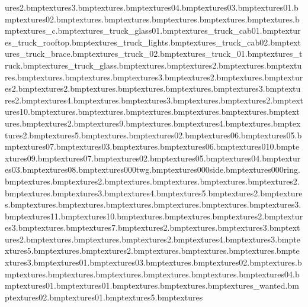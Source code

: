 ures\tazfacecoin2.bmp textures\tazfacecoin3.bmp textures\tazfacecoin.bmp textures\crucher04.bmp textures\crucher03.bmp textures\crucher01.bmp textures\crucher02.bmp textures\post.bmp textures\tazwantedposback.bmp textures\vase.bmp textures\paintgoswarp.bmp textures\paintdafwarp.bmp textures\wheel_c.bmp textures\removal_truck_glass01.bmp textures\removal_truck_cab01.bmp textures\removal_truck_rooftop.bmp textures\removal_truck_lights.bmp textures\removal_truck_cab02.bmp textures\removal_truck_brace.bmp textures\removal_truck_02.bmp textures\removal_truck_01.bmp textures\removal_truck.bmp textures\removal_truck_glass.bmp textures\nut.bmp textures\nut2.bmp textures\bucketmop.bmp textures\bucket.bmp textures\warnsign.bmp textures\cardbox.bmp textures\cardbox3.bmp textures\cardbox2.bmp textures\leatherseatgreen.bmp textures\leatherseatgreen2.bmp textures\leatherseat2.bmp textures\glasscabinet.bmp textures\poolside.bmp textures\tabletop.bmp textures\plasticbox3.bmp textures\plasticbox2.bmp textures\plasticbox4.bmp textures\vertdoor.bmp textures\warningsign3.bmp textures\warningsign.bmp textures\warningsign2.bmp textures\painting10.bmp textures\sdoorglass.bmp textures\sdoor.bmp textures\barrol.bmp textures\lorrymixer.bmp textures\torch.bmp textures\cloud.bmp textures\signdirection2.bmp textures\signdirection9.bmp textures\doorbig.bmp textures\compmont4.bmp textures\compmont.bmp textures\compmont2.bmp textures\compmont5.bmp textures\compkey.bmp textures\jel02.bmp textures\jel06.bmp textures\jel05.bmp textures\jel07.bmp textures\jel03.bmp textures\jel.bmp textures\bandit06.bmp textures\bandit010.bmp textures\bandit09.bmp textures\bandit07.bmp textures\bandit02.bmp textures\bandit05.bmp textures\bandit04.bmp textures\bandit03.bmp textures\bandit08.bmp textures\1000twg.bmp textures\1000side.bmp textures\1000ring.bmp textures\rope.bmp textures\crystal2.bmp textures\crystal.bmp textures\plasticbox.bmp textures\vpaintable.bmp textures\vpaintchair2.bmp textures\vpaintchair.bmp textures\cleaner3.bmp textures\cleaner4.bmp textures\cleaner5.bmp textures\cleaner2.bmp textures\cleaner.bmp textures\liftdoorright.bmp textures\liftdoorleft.bmp textures\liftdoorrightred.bmp textures\liftglass.bmp textures\liftdoorleftred.bmp textures\marbtiles3.bmp textures\companel11.bmp textures\companel10.bmp textures\hubbackdrop.bmp textures\industcarpet.bmp textures\industcarpet2.bmp textures\industcarpet3.bmp textures\tazwanted.bmp textures\elechut7.bmp textures\bulbbase2.bmp textures\bulbbase.bmp textures\plug3.bmp textures\plug2.bmp textures\plug.bmp textures\frontdoor.bmp textures\frontdoor2.bmp textures\paintingcastle4.bmp textures\paintingcastle3.bmp textures\paintingcastle5.bmp textures\paintingcastle.bmp textures\paintingcastle2.bmp textures\paintingsamportrait.bmp textures\paintingcanvas.bmp textures\cratesteel.bmp textures\lorrymixer3.bmp textures\moltendrum01.bmp textures\moltendrum03.bmp textures\leatherseat.bmp textures\moltendrum02.bmp textures\metaldoor.bmp textures\gratting.bmp textures\facemask.bmp textures\dynamitepiccy.bmp textures\blueprint.bmp textures\horseshoepiccy.bmp textures\citypave04.bmp textures\ctblue01.bmp textures\deptlight01.bmp textures\swordandshield.bmp textures\signtoilet.bmp textures\bulb_wanted.bmp textures\anvil02.bmp textures\anvil01.bmp textures\safe5.bmp textures\safeb